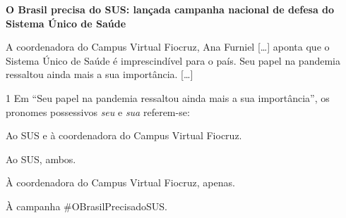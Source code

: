 \begin{myquote}
\begin{center}
\textbf{O Brasil precisa do SUS: lançada campanha nacional de defesa do
Sistema Único de Saúde}\\
\end{center}

\medskip

\noindent A coordenadora do Campus Virtual Fiocruz, Ana Furniel {[}\ldots{]}
aponta que o Sistema Único de Saúde é imprescindível para o país. Seu
papel na pandemia ressaltou ainda mais a sua importância. {[}\ldots{]}

\end{myquote}

\num{1} Em ``Seu papel na pandemia ressaltou ainda mais a sua importância'', os
pronomes possessivos \emph{seu} e \emph{sua} referem-se:

\begin{escolha}
\item Ao SUS e à coordenadora do Campus Virtual Fiocruz.
\item Ao SUS, ambos.
\item À coordenadora do Campus Virtual Fiocruz, apenas.
\item À campanha \#OBrasilPrecisadoSUS.
\end{escolha}



